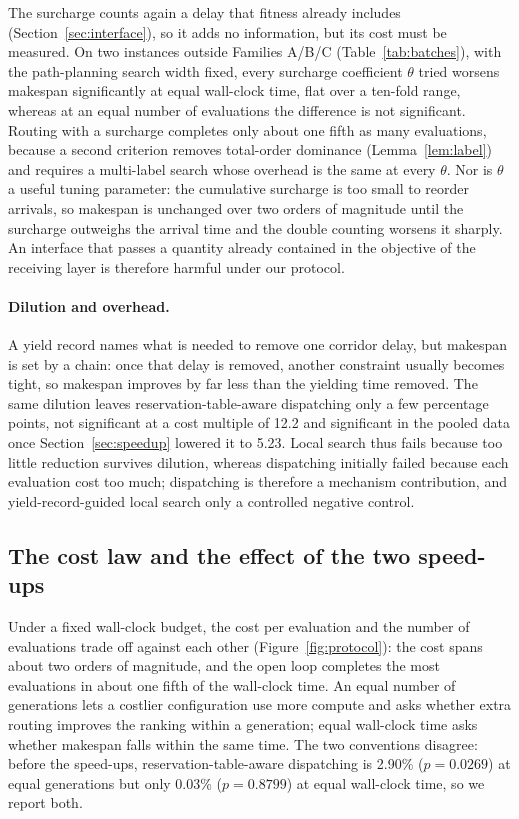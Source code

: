 \documentclass[preprint,review,12pt,authoryear,doubleblind]{elsarticle}
\newcommand{\CostMultBefore}{12.2}
\newcommand{\CostMultAfter}{5.23}
\newcommand{\GainProbeSameGen}{2.90\%}
\newcommand{\PProbeSameGen}{=0.0269}
\newcommand{\GainProbeSameClock}{0.03\%}
\newcommand{\PProbeSameClock}{=0.8799}
\begin{document}
The surcharge counts again a delay that fitness already includes (Section~\ref{sec:interface}), so it adds no information, but its cost must be measured. On two instances outside Families A/B/C (Table~\ref{tab:batches}), with the path-planning search width fixed, every surcharge coefficient $\theta$ tried worsens makespan significantly at equal wall-clock time, flat over a ten-fold range, whereas at an equal number of evaluations the difference is not significant. Routing with a surcharge completes only about one fifth as many evaluations, because a second criterion removes total-order dominance (Lemma~\ref{lem:label}) and requires a multi-label search whose overhead is the same at every $\theta$. Nor is $\theta$ a useful tuning parameter: the cumulative surcharge is too small to reorder arrivals, so makespan is unchanged over two orders of magnitude until the surcharge outweighs the arrival time and the double counting worsens it sharply. An interface that passes a quantity already contained in the objective of the receiving layer is therefore harmful under our protocol.

\paragraph{Dilution and overhead.}
\label{sec:whycost}
A yield record names what is needed to remove one corridor delay, but makespan is set by a chain: once that delay is removed, another constraint usually becomes tight, so makespan improves by far less than the yielding time removed. The same dilution leaves reservation-table-aware dispatching only a few percentage points, not significant at a cost multiple of \CostMultBefore{} and significant in the pooled data once Section~\ref{sec:speedup} lowered it to \CostMultAfter{}. Local search thus fails because too little reduction survives dilution, whereas dispatching initially failed because each evaluation cost too much; dispatching is therefore a mechanism contribution, and yield-record-guided local search only a controlled negative control.


\subsection{The cost law and the effect of the two speed-ups}
\label{sec:costlaw}

Under a fixed wall-clock budget, the cost per evaluation and the number of evaluations trade off against each other (Figure~\ref{fig:protocol}): the cost spans about two orders of magnitude, and the open loop completes the most evaluations in about one fifth of the wall-clock time. An equal number of generations lets a costlier configuration use more compute and asks whether extra routing improves the ranking within a generation; equal wall-clock time asks whether makespan falls within the same time. The two conventions disagree: before the speed-ups, reservation-table-aware dispatching is \GainProbeSameGen{} ($p\PProbeSameGen$) at equal generations but only \GainProbeSameClock{} ($p\PProbeSameClock$) at equal wall-clock time, so we report both.
\end{document}
